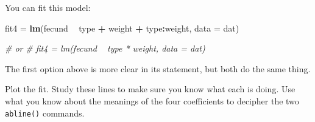 \documentclass[]{book}
\newenvironment{Shaded}{\begin{snugshade}}{\end{snugshade}}
\newcommand{\CommentTok}[1]{\textcolor[rgb]{0.56,0.35,0.01}{\textit{#1}}}
\newcommand{\DataTypeTok}[1]{\textcolor[rgb]{0.13,0.29,0.53}{#1}}
\newcommand{\DecValTok}[1]{\textcolor[rgb]{0.00,0.00,0.81}{#1}}
\newcommand{\FloatTok}[1]{\textcolor[rgb]{0.00,0.00,0.81}{#1}}
\newcommand{\KeywordTok}[1]{\textcolor[rgb]{0.13,0.29,0.53}{\textbf{#1}}}
\newcommand{\NormalTok}[1]{#1}
\newcommand{\OperatorTok}[1]{\textcolor[rgb]{0.81,0.36,0.00}{\textbf{#1}}}
\newcommand{\StringTok}[1]{\textcolor[rgb]{0.31,0.60,0.02}{#1}}
\begin{document}
You can fit this model:

\begin{Shaded}
\begin{Highlighting}[]
\NormalTok{fit4 =}\StringTok{ }\KeywordTok{lm}\NormalTok{(fecund }\OperatorTok{~}\StringTok{ }\NormalTok{type }\OperatorTok{+}\StringTok{ }\NormalTok{weight }\OperatorTok{+}\StringTok{ }\NormalTok{type}\OperatorTok{:}\NormalTok{weight, }\DataTypeTok{data =}\NormalTok{ dat)}

\CommentTok{# or}
\CommentTok{# fit4 = lm(fecund ~ type * weight, data = dat)}
\end{Highlighting}
\end{Shaded}

The first option above is more clear in its statement, but both do the same thing.

Plot the fit. Study these lines to make sure you know what each is doing. Use what you know about the meanings of the four coefficients to decipher the two \texttt{abline()} commands.

\begin{Shaded}
\end{Shaded}
\end{document}
